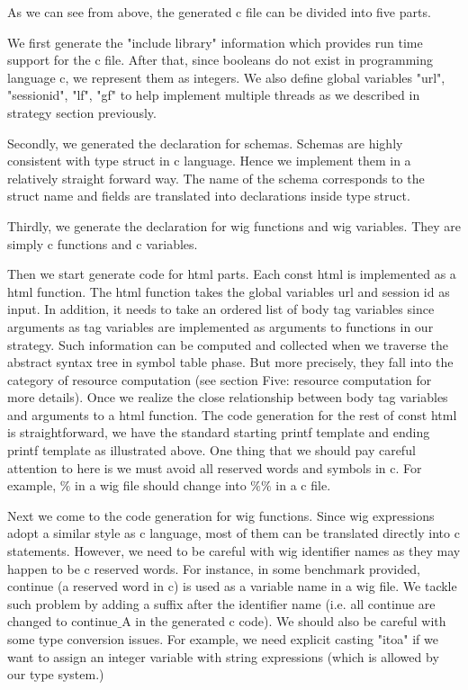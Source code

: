 \documentclass{WigReport}
\begin{document}
As we can see from above, the generated c file can be divided into five parts. 

We first generate the "include library" information which provides run time support for the c file. After that, since booleans do not exist in programming language c, we represent them as integers. We also define global variables "url", "sessionid", "lf", "gf" to help implement multiple threads as we described in strategy section previously.

Secondly, we generated the declaration for schemas. Schemas are highly consistent with type struct in c language. Hence we implement them in a relatively straight forward way. The name of the schema corresponds to the struct name and fields are translated into declarations inside type struct.

Thirdly, we generate the declaration for wig functions and wig variables. They are simply c functions and c variables.

Then we start generate code for html parts. Each const html is implemented as a html function. The html function takes the global variables url and session id as input. In addition, it needs to take an ordered list of body tag variables since arguments as tag variables are implemented as arguments to functions in our strategy. Such information can be computed and collected when we traverse the abstract syntax tree in symbol table phase. But more precisely, they fall into the category of resource computation (see section Five: resource computation for more details). Once we realize the close relationship between body tag variables and arguments to a html function. The code generation for the rest of const html is straightforward, we have the standard starting printf template and ending printf template as illustrated above. One thing that we should pay careful attention to here is we must avoid all reserved words and symbols in c. For example, $\%$ in a wig file should change into $\%\%$ in a c file.

Next we come to the code generation for wig functions. Since wig expressions adopt a similar style as c language, most of them can be translated directly into c statements. However, we need to be careful with wig identifier names as they may happen to be c reserved words. For instance, in some benchmark provided, continue (a reserved word in c) is used as a variable name in a wig file. We tackle such problem by adding a suffix after the identifier name (i.e. all continue are changed to continue$\_$A in the generated c code). We should also be careful with some type conversion issues. For example, we need explicit casting "itoa" if we want to assign an integer variable with string expressions (which is allowed by our type system.)
\end{document}
